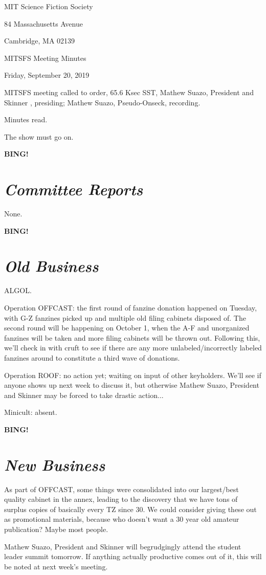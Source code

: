 \documentclass[10pt]{article}
\newcommand{\bing}{{\bf BING!} }
\newcommand{\goto}[1]{\bing \vskip 12pt \section*{{\em{#1}}}}
\newcommand{\skinner}{Mathew Suazo, President and Skinner }
\newcommand{\onseck}{Mathew Suazo, Pseudo-Onseck}
\newcommand{\meetingdate}{Friday, September 20, 2019 }
\begin{document}
\begin{center}

MIT Science Fiction Society

84 Massachusetts Avenue

Cambridge, MA 02139

\vspace{12pt}

MITSFS Meeting Minutes

\meetingdate

\end{center}

\vspace{18pt}

\setlength{\parskip}{6pt}

\noindent
MITSFS meeting called to order, 65.6 Ksec SST,
\skinner, presiding; \onseck, recording.

Minutes read.

The show must go on.

\goto{Committee Reports}

None.

\goto{Old Business}

ALGOL.

Operation OFFCAST: the first round of fanzine donation happened on Tuesday, with G-Z fanzines picked up and multiple old filing cabinets disposed of. The second round will be happening on October 1, when the A-F and unorganized fanzines will be taken and more filing cabinets will be thrown out. Following this, we'll check in with cruft to see if there are any more unlabeled/incorrectly labeled fanzines around to constitute a third wave of donations.

Operation ROOF: no action yet; waiting on input of other keyholders. We'll see if anyone shows up next week to discuss it, but otherwise \skinner may be forced to take drastic action...

Minicult: absent.

\goto{New Business}

As part of OFFCAST, some things were consolidated into our largest/best quality cabinet in the annex, leading to the discovery that we have tons of surplus copies of basically every TZ since 30. We could consider giving these out as promotional materials, because who doesn't want a 30 year old amateur publication? Maybe most people.

\skinner will begrudgingly attend the student leader summit tomorrow. If anything actually productive comes out of it, this will be noted at next week's meeting.
\end{document}
